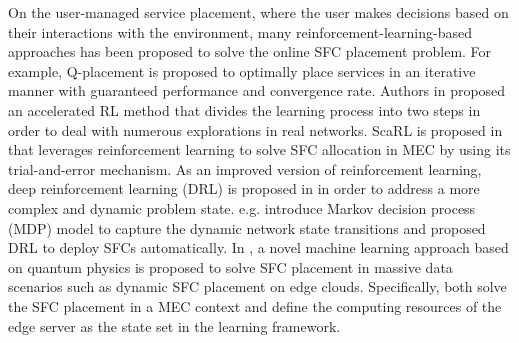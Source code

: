 On the user-managed service placement, where the user makes decisions based on their interactions with the environment, many reinforcement-learning-based approaches \cite{learningbasedvnf, QPlacement, Environment-AdaptiveRL, OnlineFault-tolerantDRL, NFVdeep, RLCellularnetwork, ScaRL, QuantummachinelearningSFCMEC} has been proposed to solve the online SFC placement problem. 
For example, Q-placement\cite{QPlacement} is proposed to optimally place services in an iterative manner with guaranteed performance and convergence rate. Authors in \cite{Environment-AdaptiveRL} proposed an accelerated RL method that divides the learning process into two steps in order to deal with numerous explorations in real networks. %
ScaRL is proposed in \cite{ScaRL} that leverages reinforcement learning to solve SFC allocation in MEC by using its trial-and-error mechanism.
%
As an improved version of reinforcement learning, deep reinforcement learning (DRL) is proposed in 
\cite{NFVdeep, Parallel-Deep-Reinforcement-Learning, OnlineFault-tolerantDRL} in order to address a more complex and dynamic problem state. e.g. \cite{NFVdeep} introduce Markov decision process (MDP) model to capture the dynamic network state transitions and proposed DRL to deploy SFCs automatically.
%
In \cite{QuantummachinelearningSFCMEC}, a novel machine learning approach based on quantum physics is proposed to solve SFC placement in massive data scenarios such as dynamic SFC placement on edge clouds.
%
Specifically, \cite{ScaRL, QuantummachinelearningSFCMEC} both solve the SFC placement in a MEC context and define the computing resources of the edge server as the state set in the learning framework. 

